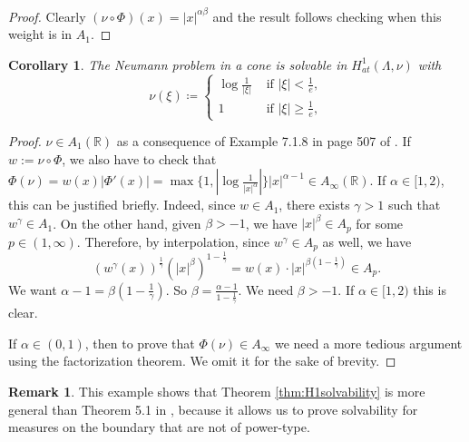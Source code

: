 \documentclass[12pt]{amsart}
\newcommand{\R}{\mathbb{R}}
\theoremstyle{plain}
\newtheorem{corollary}[theorem]{Corollary}
\theoremstyle{definition}
\newtheorem{remark}[theorem]{Remark}
\numberwithin{equation}{section}
\begin{document}
\begin{proof} Clearly $(\nu\circ \Phi)(x)=|x|^{\alpha\beta}$ and the result follows checking when this weight is in $A_1$. 
\end{proof}


\begin{corollary}
    The Neumann problem in a cone is solvable in $H_{at}^1(\Lambda, \nu)$ with 
    \begin{equation*}\label{eq:logWeightExampleH1}
\nu(\xi)
\coloneqq 
\begin{cases}
    \log{\frac{1}{|\xi|}} & \text{ if }|\xi|<\frac{1}{e},\\
    1 & \text{ if }|\xi|\geq \frac{1}{e},
\end{cases}    
\end{equation*}
\end{corollary}

\begin{proof}
$\nu\in A_1(\R)$ as a consequence of Example 7.1.8 in page 507 of \cite{grafakosClassical}. If $w:=\nu\circ\Phi$, we also have to check that $\Phi(\nu)=w(x)|\Phi'(x)|=\max\{1,|\log{\frac{1}{|x|^{\alpha}}}|\}|x|^{\alpha-1}\in A_{\infty}(\R)$. If $\alpha\in [1,2)$, this can be justified briefly. Indeed, since $w\in A_1$, there exists $\gamma>1$ such that $w^{\gamma}\in A_1$. On the other hand, given $\beta>-1$, we have $|x|^{\beta}\in A_p$ for some $p\in (1,\infty)$. Therefore, by interpolation, since $w^{\gamma}\in A_p$ as well, we have
\[
(w^{\gamma}(x))^{\frac{1}{\gamma}}(|x|^{\beta})^{1-\frac{1}{\gamma}}
=
w(x)\cdot |x|^{\beta(1-\frac{1}{\gamma})}
\in A_p.
\]
We want $\alpha-1=\beta(1-\frac{1}{\gamma})$. So $\beta=\frac{\alpha-1}{1-\frac{1}{\gamma}}$. We need $\beta>-1$. If $\alpha\in [1,2)$ this is clear. 

If $\alpha\in (0,1)$, then to prove that $\Phi(\nu)\in A_{\infty}$ we need a more tedious argument using the factorization theorem. We omit it for the sake of brevity.
\end{proof}

\begin{remark}
    This example shows that Theorem \ref{thm:H1solvability} is more general than Theorem 5.1 in
    \cite{LanzaniCapognaBrown}, because it allows us to prove solvability for measures on the boundary that are not of power-type.
\end{remark}
\end{document}

